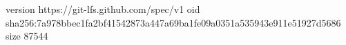 version https://git-lfs.github.com/spec/v1
oid sha256:7a978bbec1fa2bf41542873a447a69ba1fe09a0351a535943e911e51927d5686
size 87544
